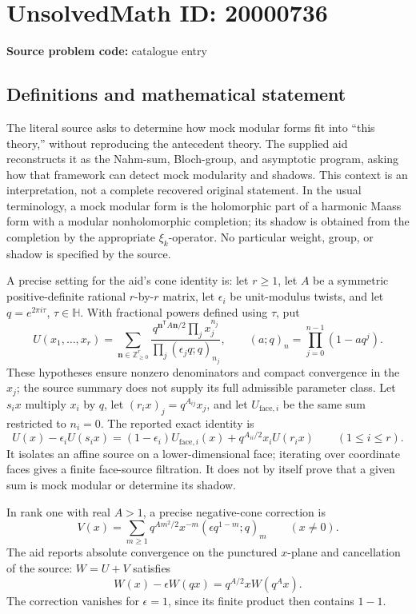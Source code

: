 \documentclass[11pt]{article}
\newcommand{\Z}{\mathbb{Z}}
\begin{document}
\section*{UnsolvedMath ID: 20000736}
\textbf{Source problem code:} catalogue entry
\subsection{Definitions and mathematical statement}
The literal source asks to determine how mock modular forms fit into ``this theory,'' without reproducing the antecedent theory. The supplied aid reconstructs it as the Nahm-sum, Bloch-group, and asymptotic program, asking how that framework can detect mock modularity and shadows. This context is an interpretation, not a complete recovered original statement. In the usual terminology, a mock modular form is the holomorphic part of a harmonic Maass form with a modular nonholomorphic completion; its shadow is obtained from the completion by the appropriate \(\xi_k\)-operator. No particular weight, group, or shadow is specified by the source.

A precise setting for the aid's cone identity is: let \(r\geq1\), let \(A\) be a symmetric positive-definite rational \(r\)-by-\(r\) matrix, let \(\epsilon_i\) be unit-modulus twists, and let \(q=e^{2\pi i\tau}\), \(\tau\in\mathbb H\). With fractional powers defined using \(\tau\), put
\[
 U(x_1,\ldots,x_r)=\sum_{\mathbf n\in\Z_{\geq0}^r}
 \frac{q^{\mathbf n^{\mathsf T}A\mathbf n/2}\prod_jx_j^{n_j}}
 {\prod_j(\epsilon_jq;q)_{n_j}},\qquad
 (a;q)_n=\prod_{j=0}^{n-1}(1-aq^j).
\]
These hypotheses ensure nonzero denominators and compact convergence in the \(x_j\); the source summary does not supply its full admissible parameter class. Let \(s_ix\) multiply \(x_i\) by \(q\), let \((r_ix)_j=q^{A_{ij}}x_j\), and let \(U_{\mathrm{face},i}\) be the same sum restricted to \(n_i=0\). The reported exact identity is
\[
 U(x)-\epsilon_iU(s_ix)
 =(1-\epsilon_i)U_{\mathrm{face},i}(x)
 +q^{A_{ii}/2}x_iU(r_ix)\qquad(1\leq i\leq r).
\]
It isolates an affine source on a lower-dimensional face; iterating over coordinate faces gives a finite face-source filtration. It does not by itself prove that a given sum is mock modular or determine its shadow.

In rank one with real \(A>1\), a precise negative-cone correction is
\[
 V(x)=\sum_{m\geq1}q^{Am^2/2}x^{-m}(\epsilon q^{1-m};q)_m\qquad(x\neq0).
\]
The aid reports absolute convergence on the punctured \(x\)-plane and cancellation of the source: \(W=U+V\) satisfies
\[
 W(x)-\epsilon W(qx)=q^{A/2}xW(q^Ax).
\]
The correction vanishes for \(\epsilon=1\), since its finite product then contains \(1-1\).
\end{document}
